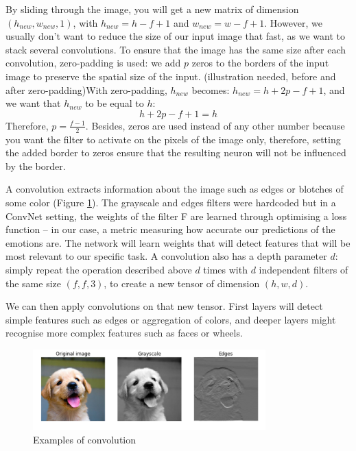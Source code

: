 By sliding through the image, you will get a new matrix of dimension $(h_{new}, w_{new},1)$, with $h_{new}=h-f+1$ and $w_{new}=w-f+1$. However, we usually don't want to reduce the size of our input image that fast, as we want to stack several convolutions. To ensure that the image has the same size after each convolution, zero-padding is used: we add $p$ zeros to the borders of the input image to preserve the spatial size of the input. (illustration needed, before and after zero-padding)With zero-padding, $h_{new}$ becomes: $h_{new} =  h + 2p - f + 1$, and we want that $h_{new}$ to be equal to $h$:
\begin{equation}
h + 2p - f + 1 = h
\end{equation}
Therefore, $p=\frac{f-1}{2}$. Besides, zeros are used instead of any other number because you want the filter to activate on the pixels of the image only, therefore, setting the added border to zeros ensure that the resulting neuron will not be influenced by the border.

A convolution extracts information about the image such as edges or blotches of some color (Figure \ref{conv-ex}). The grayscale and edges filters were hardcoded but in a ConvNet setting, the weights of the filter F are learned through optimising a loss function -- in our case, a metric measuring how accurate our predictions of the emotions are. The network will learn weights that will detect features that will be most relevant to our specific task. A convolution also has a depth parameter $d$: simply repeat the operation described above $d$ times with $d$ independent filters of the same size $(f, f, 3)$, to create a new tensor of dimension $(h,w,d)$.

We can then apply convolutions on that new tensor. First layers will detect simple features such as edges or aggregation of colors, and deeper layers might recognise more complex features such as faces or wheels.

\begin{figure}
\centering
\includegraphics[width=0.8\textwidth]{Images/conv_ex.png}
\caption{Examples of convolution}
\label{conv-ex}
\end{figure}

